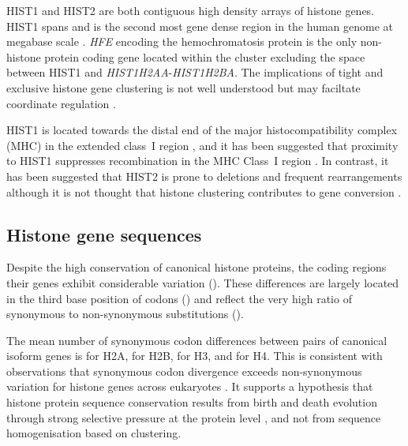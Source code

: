     HIST1 and HIST2 are both contiguous high density arrays of histone genes.
    HIST1 spans \HISTOneSpan{} 
    and is the second most gene dense region in the human genome at megabase scale \citep{MHC-III-analysis}.
    \textit{HFE} encoding the hemochromatosis protein \citep{AlbigDoenecke1998}
    is the only non-histone protein coding gene located within the cluster
    excluding the space between HIST1 and \textit{HIST1H2AA}-\textit{HIST1H2BA}.
    The implications of tight and exclusive histone gene clustering
    is not well understood but may faciltate coordinate regulation \citep{Eirinlopez2009,close-regulators}.

    HIST1 is located towards the distal end of the major histocompatibility complex (MHC)
    in the extended class~I region \citep{MHC-I-transcript, MHC-complete-sequencing-1999},
    and it has been suggested that proximity to HIST1
    suppresses recombination in the MHC Class~I region \citep{MHC-repressed-by-HIST}.
    In contrast, it has been suggested that HIST2 is prone to
    deletions and frequent rearrangements \citep{HISTTwo-prone-deletion-discovery, HISTTwo-prone-deletion-focus}
    although it is not thought that histone clustering contributes to gene conversion \citep{NeiRooney2005}.

  \subsection{Histone gene sequences}
    Despite the high conservation of canonical histone proteins,
    the coding regions their genes exhibit considerable variation ().
    These differences are largely located in the third base position of codons ()
    and reflect the very high ratio of synonymous to non-synonymous substitutions ().

    The mean number of synonymous codon differences between pairs of canonical isoform genes is
     for H2A,
     for H2B,
     for H3,
    and  for H4.
    This is consistent with observations that
    synonymous codon divergence exceeds non-synonymous variation
    for histone genes across eukaryotes \citep{Piontkivska2002, Rooney2002}.
    It supports a hypothesis that histone protein sequence conservation
    results from birth and death evolution through strong selective pressure at the protein level \citep{NeiRooney2005},
    and not from sequence homogenisation based on clustering.

